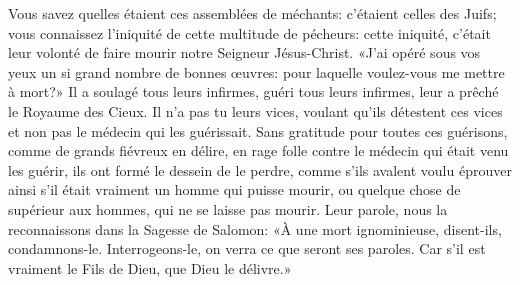 Vous savez quelles étaient ces assemblées de méchants:
	c’étaient celles des Juifs;
	vous connaissez l’iniquité de cette multitude de pécheurs:
	cette iniquité,
		c’était leur volonté de faire mourir notre Seigneur Jésus-Christ.
«J’ai opéré sous vos yeux un si grand nombre de bonnes œuvres:
	pour laquelle voulez-vous me mettre à mort?»
Il a soulagé tous leurs infirmes, guéri tous leurs infirmes,
	leur a prêché le Royaume des Cieux.
Il n’a pas tu leurs vices, voulant qu’ils détestent ces vices
	et non pas le médecin qui les guérissait.
Sans gratitude pour toutes ces guérisons, comme de grands fiévreux en délire,
	en rage folle contre le médecin qui était venu les guérir,
	ils ont formé le dessein de le perdre,
	comme s’ils avalent voulu éprouver ainsi
		s’il était vraiment un homme qui puisse mourir,
	ou quelque chose de supérieur aux hommes, qui ne se laisse pas mourir.
Leur parole, nous la reconnaissons dans la Sagesse de Salomon:
	«À une mort ignominieuse, disent-ils, condamnons-le.
	Interrogeons-le, on verra ce que seront ses paroles.
	Car s’il est vraiment le Fils de Dieu, que Dieu le délivre.»
